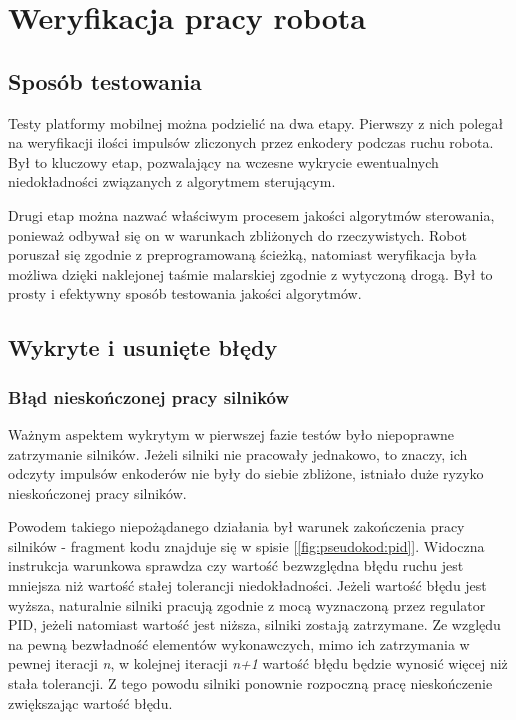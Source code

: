 \chapter{Weryfikacja pracy robota}
\label{ch:07}

\section{Sposób testowania}

Testy platformy mobilnej można podzielić na dwa etapy. Pierwszy z nich polegał na weryfikacji ilości impulsów zliczonych przez enkodery podczas ruchu robota. Był to kluczowy etap, pozwalający na wczesne wykrycie ewentualnych niedokładności związanych z algorytmem sterującym. 

Drugi etap można nazwać właściwym procesem jakości algorytmów sterowania, ponieważ odbywał się on w warunkach zbliżonych do rzeczywistych. Robot poruszał się zgodnie z preprogramowaną ścieżką, natomiast weryfikacja była możliwa dzięki naklejonej taśmie malarskiej zgodnie z wytyczoną drogą. Był to prosty i efektywny sposób testowania jakości algorytmów. 


\section{Wykryte i usunięte błędy}


\subsection{Błąd nieskończonej pracy silników}
Ważnym aspektem wykrytym w pierwszej fazie testów było niepoprawne zatrzymanie silników. Jeżeli silniki nie pracowały jednakowo, to znaczy, ich odczyty impulsów enkoderów nie były do siebie zbliżone, istniało duże ryzyko nieskończonej pracy silników. 

Powodem takiego niepożądanego działania był warunek zakończenia pracy silników - fragment kodu znajduje się w spisie [\ref{fig:pseudokod:pid}]. Widoczna instrukcja warunkowa sprawdza czy wartość bezwzględna błędu ruchu jest mniejsza niż wartość stałej tolerancji niedokładności. Jeżeli wartość błędu jest wyższa, naturalnie silniki pracują zgodnie z mocą wyznaczoną przez regulator PID, jeżeli natomiast wartość jest niższa, silniki zostają zatrzymane. Ze względu na pewną bezwładność elementów wykonawczych, mimo ich zatrzymania w pewnej iteracji \textit{n}, w kolejnej iteracji \textit{n+1} wartość błędu będzie wynosić więcej niż stała tolerancji. Z tego powodu silniki ponownie rozpoczną pracę nieskończenie zwiększając wartość błędu. 

